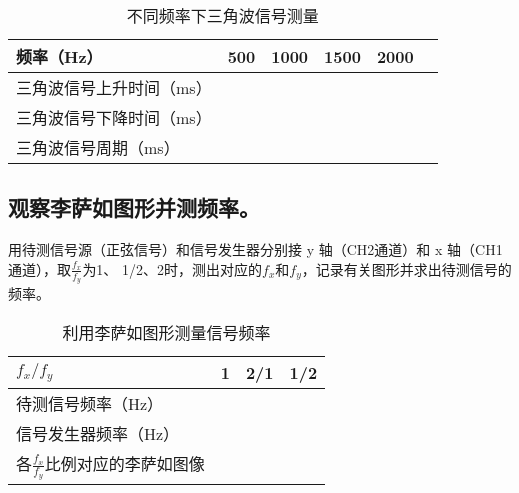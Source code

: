 \documentclass{ctexart}
\begin{document}
\begin{table}[h]
    \centering
    \caption{不同频率下三角波信号测量}
    \label{tab:self_2}
    \begin{tabular}{|m{3.5cm}<{\centering}|m{2cm}<{\centering}|m{2cm}<{\centering}|m{2cm}<{\centering}|m{2cm}<{\centering}|m{2cm}<{\centering}|}
        \hline
        频率（Hz） & 500 & 1000 & 1500 & 2000 \\
        \hline
        三角波信号上升时间（ms） & & & & \\
        \hline
        三角波信号下降时间（ms）& & & & \\
        \hline
        三角波信号周期（ms）& & & & \\
        \hline
    \end{tabular}
\end{table}

\subsection{观察李萨如图形并测频率。}
用待测信号源（正弦信号）和信号发生器分别接 y 轴（CH2通道）和 x 轴（CH1通道），取$\frac{f_x}{f_y}$为1、 1/2、2时，测出对应的$f_x$和$f_y$，记录有关图形并求出待测信号的频率。

\newpage
\begin{table}[h]
    \centering
    \caption{利用李萨如图形测量信号频率}
    \label{tab:self_3}
    \begin{tabular}{|m{2cm}<{\centering}|m{3cm}<{\centering}|m{3cm}<{\centering}|m{3cm}<{\centering}|}
        \hline
        $f_x / f_y$ & 1 & 2/1 & 1/2 \\
        \hline
        待测信号频率（Hz） & & & \\
        \hline
        信号发生器频率（Hz）& & & \\
        \hline
        各$\frac{f_x}{f_y}$比例对应的李萨如图像  & & & \\
        \hline
    \end{tabular}
\end{table}

\end{document}
